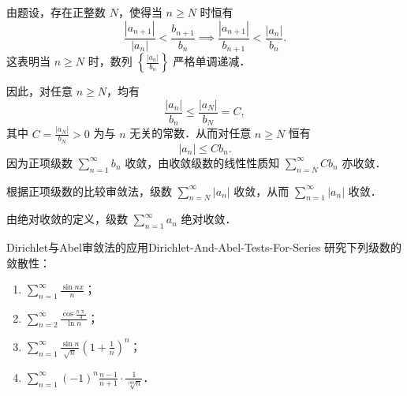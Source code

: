 \begin{myproof}
    由题设，存在正整数 $N$，使得当 $n \geqslant N$ 时恒有
    \begin{equation}
        \frac{|a_{n+1}|}{|a_n|} < \frac{b_{n+1}}{b_n} \implies \frac{|a_{n+1}|}{b_{n+1}} < \frac{|a_n|}{b_n}.
    \end{equation}
    这表明当 $n \geqslant N$ 时，数列 $\left\{ \frac{|a_n|}{b_n} \right\}$ 严格单调递减．

    因此，对任意 $n \geqslant N$，均有
    \begin{equation}
        \frac{|a_n|}{b_n} \leqslant \frac{|a_N|}{b_N} = C,
    \end{equation}
    其中 $C = \frac{|a_N|}{b_N} > 0$ 为与 $n$ 无关的常数．从而对任意 $n \geqslant N$ 恒有
    \begin{equation}
        |a_n| \leqslant C b_n.
    \end{equation}
    因为正项级数 $\sum_{n=1}^\infty b_n$ 收敛，由收敛级数的线性性质知 $\sum_{n=N}^\infty C b_n$ 亦收敛．

    根据正项级数的比较审敛法，级数 $\sum_{n=N}^\infty |a_n|$ 收敛，从而 $\sum_{n=1}^\infty |a_n|$ 收敛．

    由绝对收敛的定义，级数 $\sum_{n=1}^\infty a_n$ 绝对收敛．
\end{myproof}

\begin{problem}{Dirichlet与Abel审敛法的应用}{Dirichlet-And-Abel-Tests-For-Series}
    研究下列级数的敛散性：
    \begin{enumerate}
        \item $\sum_{n=1}^\infty \frac{\sin nx}{n}$；
        \item $\sum_{n=2}^\infty \frac{\cos \frac{n\uppi}{4}}{\ln n}$；
        \item $\sum_{n=1}^\infty \frac{\sin n}{\sqrt{n}}\left(1 + \frac{1}{n}\right)^n$；
        \item $\sum_{n=1}^\infty (-1)^n \frac{n-1}{n+1} \cdot \frac{1}{\sqrt[100]{n}}$．
    \end{enumerate}
\end{problem}

